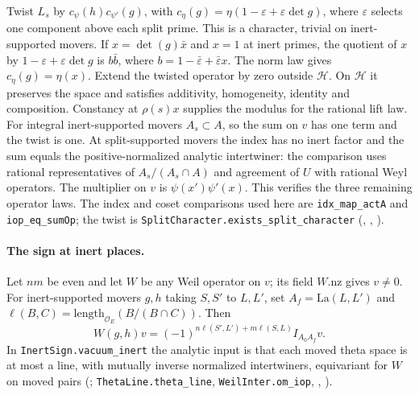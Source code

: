 Twist $L_s$ by $c_\psi(h)c_{\psi'}(g)$, with
$c_\eta(g)=\eta(1-\varepsilon+\varepsilon\det g)$, where
$\varepsilon$ selects one component above each split prime. This is a
character, trivial on inert-supported movers. If
$x=\det(g)\bar x$ and $x=1$ at inert primes, the quotient of $x$ by
$1-\varepsilon+\varepsilon\det g$ is $b\bar b$, where
$b=1-\bar\varepsilon+\bar\varepsilon x$. The norm law gives
$c_\eta(g)=\eta(x)$. Extend the twisted operator by zero outside
$\mathcal H$. On $\mathcal H$ it preserves the space and satisfies
additivity, homogeneity, identity and composition. Constancy at
$\rho(s)x$ supplies the modulus for the rational lift law. For
integral inert-supported movers $A_s\subset A$, so the sum on $v$
has one term and the twist is one. At split-supported movers the index
has no inert factor and the sum equals the positive-normalized analytic
intertwiner: the comparison uses rational representatives of
$A_s/(A_s\cap A)$ and agreement of $U$ with rational Weyl operators.
The multiplier on $v$ is $\psi(x')\psi'(x)$. This verifies the three
remaining operator laws. The index and coset comparisons used here
are \nolinkurl{idx_map_actA} and \nolinkurl{iop_eq_sumOp}; the twist
is \nolinkurl{SplitCharacter.exists_split_character}
(,
,
).

\paragraph{The sign at inert places.}\label{r15:vacuum-inert}
Let $nm$ be even and let $W$ be any Weil operator on $v$; its field
$W.\mathrm{nz}$ gives $v\ne0$. For inert-supported movers $g,h$
taking $S,S'$ to $L,L'$, set $A_f=\mathrm{La}(L,L')$ and
$\ell(B,C)=\mathrm{length}_{\mathcal O_E}(B/(B\cap C))$. Then
\[
 W(g,h)v=(-1)^{n\ell(S',L')+m\ell(S,L)} I_{A_0 A_f}v.
\]
In \nolinkurl{InertSign.vacuum_inert} the analytic input is that each
moved theta space is at most a line, with mutually inverse normalized
intertwiners, equivariant for $W$ on moved pairs
(;
\nolinkurl{ThetaLine.theta_line}, \nolinkurl{WeilInter.om_iop},
,
).

